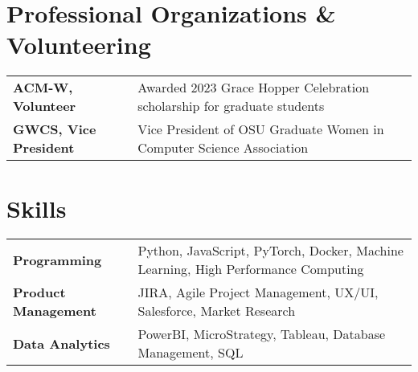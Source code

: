 \documentclass[a4paper,10pt]{article}
\begin{document}
\section{Professional Organizations \& Volunteering}
\begin{tabularx}{\linewidth}{@{}l X@{}}
\textbf{ACM-W, Volunteer} & \normalsize{Awarded 2023 Grace Hopper Celebration scholarship for graduate students} \\
\textbf{GWCS, Vice President}  & \normalsize{Vice President of OSU Graduate Women in Computer Science Association}\\ 

\end{tabularx}

\section{Skills}
\begin{tabularx}{\linewidth}{@{}l X@{}}
\textbf{Programming} &  \normalsize{Python, JavaScript, PyTorch, Docker, Machine Learning, High Performance Computing}\\
\textbf{Product Management}  &  \normalsize{JIRA, Agile Project Management, UX/UI, Salesforce, Market Research}\\  
\textbf{Data Analytics}  &  \normalsize{PowerBI, MicroStrategy, Tableau, Database Management, SQL}\\ 
\end{tabularx}

\vfill
{}
\end{document}
